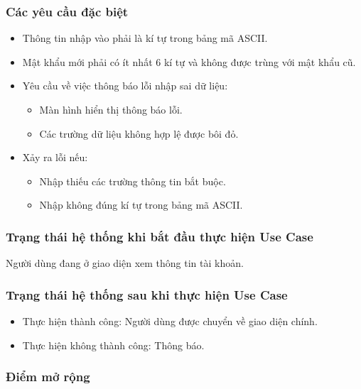 \subsubsection{Các yêu cầu đặc biệt}
\begin{itemize}
  \item Thông tin nhập vào phải là kí tự trong bảng mã ASCII.
  \item Mật khẩu mới phải có ít nhất 6 kí tự và không được trùng với mật khẩu cũ.
  \item Yêu cầu về việc thông báo lỗi nhập sai dữ liệu:
    \begin{itemize}
      \item Màn hình hiển thị thông báo lỗi.
      \item Các trường dữ liệu không hợp lệ được bôi đỏ.
    \end{itemize}
  \item Xảy ra lỗi nếu:
    \begin{itemize}
      \item Nhập thiếu các trường thông tin bắt buộc.
      \item Nhập không đúng kí tự trong bảng mã ASCII.
    \end{itemize}
\end{itemize}

\subsubsection{Trạng thái hệ thống khi bắt đầu thực hiện Use Case}
Người dùng đang ở giao diện xem thông tin tài khoản.

\subsubsection{Trạng thái hệ thống sau khi thực hiện Use Case}
\begin{itemize}
  \item Thực hiện thành công: Người dùng được chuyển về giao diện chính.
  \item Thực hiện không thành công: Thông báo.
\end{itemize}

\subsubsection{Điểm mở rộng}